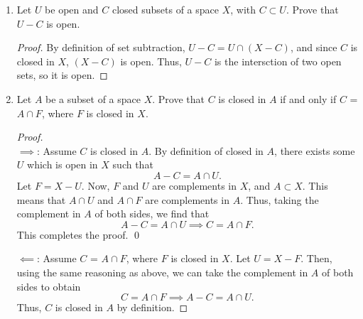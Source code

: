 \documentclass[letterpaper]{article}
\begin{document}
\begin{enumerate}
\item Let $U$ be open and $C$ closed subsets of a 
space $X$, with $C \subset U$. Prove that $U-C$ is open.
\begin{proof} 
By definition of set subtraction, $U-C=U\cap (X-C)$, and since $C$ is closed in $X$, $(X-C)$ is open. Thus, $U-C$ is the intersction of two open sets, so it is open.
\end{proof} 
\pagebreak
\item Let $A$ be a subset of a space $X$. Prove that $C$ is closed in $A$ if and only if $C$ = $A\cap F$, where $F$ is closed in $X$.
\begin{proof}\mbox{}\\
$\implies$: Assume $C$ is closed in $A$. By definition of closed in $A$, there exists some $U$ which is open in $X$ such that $$A-C=A\cap U.$$ Let $F = X-U$. Now, $F$ and $U$ are complements in $X$, and $A \subset X$. This means that $A\cap U$ and $A \cap F$ are complements in $A$. Thus, taking the complement in $A$ of both sides, we find that 
$$A-C=A\cap U \implies C=A\cap F.$$ 
This completes the proof. \qed

$\impliedby$: Assume $C$ = $A\cap F$, where $F$ is closed in $X$. Let $U=X-F$. Then, using the same reasoning as above, we can take the complement in $A$ of both sides to obtain
$$C=A\cap F \implies A-C=A\cap U.$$
Thus, $C$ is closed in $A$ by definition.
\end{proof}


\end{enumerate}
\end{document}
